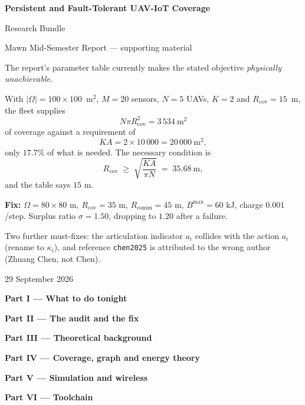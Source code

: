 \documentclass[10pt,a4paper]{report}
\newcommand{\partdiv}[1]{\clearpage\begin{center}\Huge\bfseries\color{hdr}#1\end{center}\vspace{1.5em}}
\begin{document}
\begin{titlepage}
\centering
\vspace*{2.5cm}
{\Huge\bfseries Persistent and Fault-Tolerant UAV-IoT Coverage\par}
\vspace{1cm}
{\Large Research Bundle\par}
\vspace{0.5cm}
{\large Mawn Mid-Semester Report --- supporting material\par}
\vspace{2cm}

\begin{minipage}{0.86\textwidth}
\begin{tcolorbox}[title={\bfseries The one thing you must know}]
The report's parameter table currently makes the stated objective
\emph{physically unachievable}.

With $|\Omega|=100\times100$~m$^2$, $M=20$ sensors, $N=5$ UAVs, $K=2$ and
$R_{\mathrm{cov}}=15$~m, the fleet supplies
\[
  N\pi R_{\mathrm{cov}}^2 = 3\,534\ \text{m}^2
\]
of coverage against a requirement of
\[
  KA = 2\times 10\,000 = 20\,000\ \text{m}^2 ,
\]
only \(17.7\%\) of what is needed. The necessary condition is
\[
  R_{\mathrm{cov}} \;\ge\; \sqrt{\frac{KA}{\pi N}} \;=\; 35.68\ \text{m},
\]
and the table says \(15\) m.

\textbf{Fix:} $\Omega = 80\times80$ m, $R_{\mathrm{cov}}=35$ m,
$R_{\mathrm{comm}}=45$ m, $B^{\mathrm{max}}=60$ kJ, charge $0.001$/step.
Surplus ratio $\sigma = 1.50$, dropping to $1.20$ after a failure.

Two further must-fixes: the articulation indicator $a_i$ collides with the
action $a_i$ (rename to $\kappa_i$), and reference \texttt{chen2025} is
attributed to the wrong author (Zhuang Chen, not Chen).
\end{tcolorbox}
\end{minipage}

\vfill
{\large 29 September 2026}
\end{titlepage}

\tableofcontents
\clearpage

\partdiv{Part I --- What to do tonight}


\clearpage


\partdiv{Part II --- The audit and the fix}


\clearpage

\clearpage

\clearpage


\partdiv{Part III --- Theoretical background}



\partdiv{Part IV --- Coverage, graph and energy theory}



\partdiv{Part V --- Simulation and wireless}



\partdiv{Part VI --- Toolchain}


\end{document}
